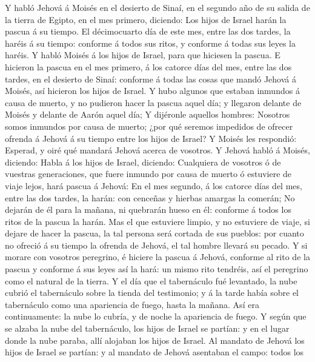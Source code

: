  Y habló Jehová á Moisés en el desierto de Sinaí, en el
segundo año de su salida de la tierra de Egipto, en el mes primero,
diciendo:  Los hijos de Israel harán la pascua á su
tiempo.  El décimocuarto día de este mes, entre las dos
tardes, la haréis á su tiempo: conforme á todos sus ritos, y conforme á
todas sus leyes la haréis.  Y habló Moisés á los hijos de
Israel, para que hiciesen la pascua.  E hicieron la pascua
en el mes primero, á los catorce días del mes, entre las dos tardes, en
el desierto de Sinaí: conforme á todas las cosas que mandó Jehová á
Moisés, así hicieron los hijos de Israel.  Y hubo algunos
que estaban inmundos á causa de muerto, y no pudieron hacer la pascua
aquel día; y llegaron delante de Moisés y delante de Aarón aquel día;
 Y dijéronle aquellos hombres: Nosotros somos inmundos por
causa de muerto; ¿por qué seremos impedidos de ofrecer ofrenda á Jehová
á su tiempo entre los hijos de Israel?  Y Moisés les
respondió: Esperad, y oiré qué mandará Jehová acerca de vosotros.
 Y Jehová habló á Moisés, diciendo:  Habla
á los hijos de Israel, diciendo: Cualquiera de vosotros ó de vuestras
generaciones, que fuere inmundo por causa de muerto ó estuviere de viaje
lejos, hará pascua á Jehová:  En el mes segundo, á los
catorce días del mes, entre las dos tardes, la harán: con cenceñas y
hierbas amargas la comerán;  No dejarán de él para la
mañana, ni quebrarán hueso en él: conforme á todos los ritos de la
pascua la harán.  Mas el que estuviere limpio, y no
estuviere de viaje, si dejare de hacer la pascua, la tal persona será
cortada de sus pueblos: por cuanto no ofreció á su tiempo la ofrenda de
Jehová, el tal hombre llevará su pecado.  Y si morare con
vosotros peregrino, é hiciere la pascua á Jehová, conforme al rito de la
pascua y conforme á sus leyes así la hará: un mismo rito tendréis, así
el peregrino como el natural de la tierra.  Y el día que
el tabernáculo fué levantado, la nube cubrió el tabernáculo sobre la
tienda del testimonio; y á la tarde había sobre el tabernáculo como una
apariencia de fuego, hasta la mañana.  Así era
continuamente: la nube lo cubría, y de noche la apariencia de fuego.
 Y según que se alzaba la nube del tabernáculo, los hijos
de Israel se partían: y en el lugar donde la nube paraba, allí alojaban
los hijos de Israel.  Al mandato de Jehová los hijos de
Israel se partían: y al mandato de Jehová asentaban el campo: todos los
